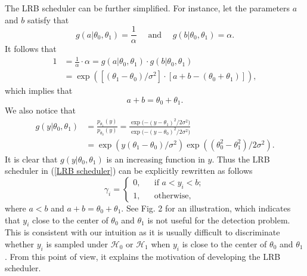 \documentclass[journal]{IEEEtran}
\def\cH{\mathcal{H}}
\begin{document}
The LRB scheduler can be further simplified. For instance, let the parameters $a$ and $b$ satisfy that
\begin{equation}
g(a| \theta_{0},\theta_{1})=\frac{1}{\alpha} \quad\text{ and }\quad g(b| \theta_{0},\theta_{1})=\alpha.
\end{equation}
It follows that
\begin{equation*}
\begin{split}
1&=\frac{1}{\alpha}\cdot\alpha =g(a| \theta_{0},\theta_{1})\cdot g(b| \theta_{0},\theta_{1})\\
&=\exp({[(\theta _1 - \theta _0)/{\sigma ^2}]\cdot[{a+b-(\theta_{0}+\theta_{1})}]}),
\end{split}
\end{equation*}
which implies that
\begin{equation}
\label{Sumofab}
a+b=\theta_{0}+\theta_{1}.
\end{equation}
We also notice that
\begin{equation*}
\begin{split}
g(y|{\theta _0},{\theta _1}) &= \frac{{{p_{{\theta _1}}}(y)}}{{{p_{{\theta _0}}}(y)}} = \frac{{{\exp({ - {{(y - {\theta _1})}^2}/2{\sigma ^2}}}})}{{{\exp({ - {{(y - {\theta _0})}^2}/2{\sigma ^2}}}})}\\
&= {\exp({y({\theta _1} - {\theta _0})/{\sigma ^2}})}{\exp({(\theta _0^2 - \theta _1^2)/2{\sigma ^2}})}.
\end{split}
\end{equation*}
It is clear that $g(y|{\theta _0},{\theta _1})$ is an increasing function in $y$. Thus the LRB scheduler in (\ref{LRB scheduler}) can be explicitly rewritten as follows
\begin{equation}
\label{lrbscheduler}
\gamma_{i}=\left\{
\begin{array}{rcl}
0,       &      &\text{if  } {a<y_{i}<b};\\
1,     &      & \text{otherwise,}
\end{array} \right.
\end{equation}
where $a<b$ and $a+b=\theta_{0}+\theta_{1}$. See Fig. 2 for an illustration, which indicates that $y_i$ close to the center of $\theta_0$ and $\theta_1$ is not useful for the detection problem. This is consistent with our intuition as it is usually difficult to discriminate whether $y_i$ is sampled under $\cH_0$ or $\cH_1$ when $y_i$ is close to the center of $\theta_0$ and $\theta_1$. From this point of view, it explains the motivation of developing the LRB scheduler.
\end{document}
